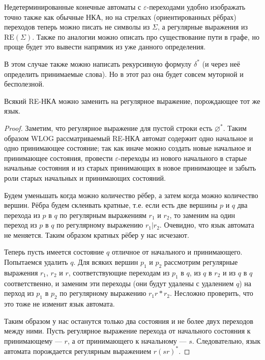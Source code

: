 \documentclass[12pt,a4paper]{article}
\newcommand{\RE}{\mathrm{RE}}
\begin{document}
    \begin{remark*}
        Недетерминированные конечные автоматы с $\varepsilon$-переходами удобно изображать точно также как обычные НКА, но на стрелках (ориентированных рёбрах) переходов теперь можно писать не символы из $\Sigma$, а регулярные выражения из $\RE(\Sigma)$. Также по аналогии можно описать про существование пути в графе, но проще будет это вывести напрямик из уже данного определения.
    \end{remark*}

    \begin{remark*}
        В этом случае также можно написать рекурсивную формулу $\delta^*$ (и через неё определить принимаемые слова). Но в этот раз она будет совсем муторной и бесполезной.
    \end{remark*}

    \begin{lemma}
        Всякий RE-НКА можно заменить на регулярное выражение, порождающее тот же язык.
    \end{lemma}

    \begin{proof}
        Заметим, что регулярное выражение для пустой строки есть $\varnothing^*$. Таким образом WLOG рассматриваемый RE-НКА автомат содержит одно начальное и одно принимающее состояние; так как иначе можно создать новые начальное и принимающее состояния, провести $\varepsilon$-переходы из нового начального в старые начальные состояния и из старых принимающих в новое принимающее и забыть роли старых начальных и принимающих состояний.

        Будем уменьшать когда можно количество рёбер, а затем когда можно количество вершин. Рёбра будем склеивать кратные, т.е. если есть две вершины $p$ и $q$ два перехода из $p$ в $q$ по регулярным выражениям $r_1$ и $r_2$, то заменим на один переход из $p$ в $q$ по регулярному выражению $r_1 | r_2$. Очевидно, что язык автомата не меняется. Таким образом кратных рёбер у нас исчезают.

        Теперь пусть имеется состояние $q$ отличное от начального и принимающего. Попытаемся удалить $q$. Для всяких вершин $p_1$ и $p_2$ рассмотрим регулярные выражения $r_1$, $r_2$ и $r$, соответствующие переходам из $p_1$ в $q$, из $q$ в $r_2$ и из $q$ в $q$ соответственно, и заменим эти переходы (они будут удалены с удалением $q$) на перход из $p_1$ в $p_2$ по регулярному выражению $r_1 r* r_2$. Несложно проверить, что это тоже не изменит язык автомата.

        Таким образом у нас останутся только два состояния и не более двух переходов между ними. Пусть регулярное выражение перехода от начального состояния к принимающему --- $r$, а от принимающего к начальному --- $s$. Следовательно, язык автомата порождается регулярным выражением $r(sr)^*$.
    \end{proof}
\end{document}
